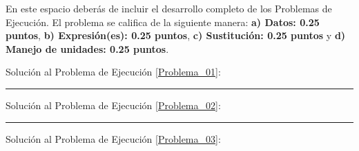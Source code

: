 \documentclass[12pt, letter]{exam}
\begin{document}
\newpage

En este espacio deberás de incluir el desarrollo completo de los Problemas de Ejecución. El problema se califica de la siguiente manera: \textbf{a) Datos: 0.25 puntos}, \textbf{b) Expresión(es): 0.25 puntos}, \textbf{c) Sustitución: 0.25 puntos} y \textbf{d) Manejo de unidades: 0.25 puntos}.

\vspace*{0.5cm}
Solución al Problema de Ejecución \ref{Problema_01}:

\vspace*{4cm}
\rule{0.9\textwidth}{0.3mm}

Solución al Problema de Ejecución \ref{Problema_02}:

\vspace*{4.5cm}
\rule{0.9\textwidth}{0.3mm}

Solución al Problema de Ejecución \ref{Problema_03}:
\end{document}
